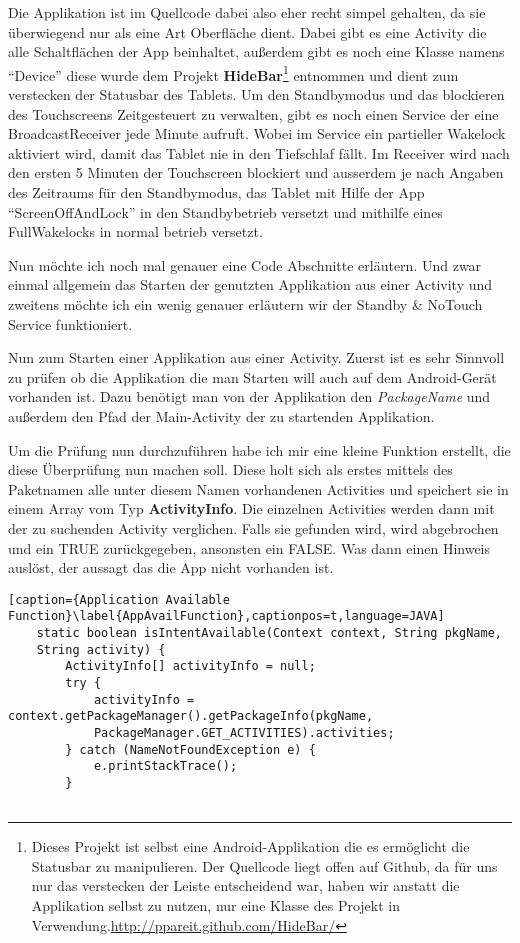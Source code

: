 \begin{flushleft}
Die Applikation ist im Quellcode dabei also eher recht simpel gehalten, da sie überwiegend nur als eine Art Oberfläche dient. Dabei gibt es eine Activity die alle Schaltflächen der App beinhaltet, außerdem gibt es noch eine Klasse namens ``Device'' diese wurde dem Projekt \textbf{HideBar}\footnote{Dieses Projekt ist selbst eine Android-Applikation die es ermöglicht die Statusbar zu manipulieren. Der Quellcode liegt offen auf Github, da für uns nur das verstecken der Leiste entscheidend war, haben wir anstatt die Applikation selbst zu nutzen, nur eine Klasse des Projekt in Verwendung.\url{http://ppareit.github.com/HideBar/}} entnommen und dient zum verstecken der Statusbar des Tablets. Um den Standbymodus und das blockieren des Touchscreens Zeitgesteuert zu verwalten, gibt es noch einen Service der eine BroadcastReceiver jede Minute aufruft. Wobei im Service ein partieller Wakelock aktiviert wird, damit das Tablet nie in den Tiefschlaf fällt. Im Receiver wird nach den ersten 5 Minuten der Touchscreen blockiert und ausserdem je nach Angaben des Zeitraums für den Standbymodus, das Tablet mit Hilfe der App ``ScreenOffAndLock'' in den Standbybetrieb versetzt und mithilfe eines FullWakelocks in normal betrieb versetzt.

Nun möchte ich noch mal genauer eine Code Abschnitte erläutern. Und zwar einmal allgemein das Starten der genutzten Applikation aus einer Activity und zweitens möchte ich ein wenig genauer erläutern wir der Standby \& NoTouch Service funktioniert.

Nun zum Starten einer Applikation aus einer Activity. Zuerst ist es sehr Sinnvoll zu prüfen ob die Applikation die man Starten will auch auf dem Android-Gerät vorhanden ist. Dazu benötigt man von der Applikation den \textit{PackageName} und außerdem den Pfad der Main-Activity der zu startenden Applikation.

Um die Prüfung nun durchzuführen habe ich mir eine kleine Funktion erstellt, die diese Überprüfung nun machen soll. Diese holt sich als erstes mittels des Paketnamen alle unter diesem Namen vorhandenen Activities und speichert sie in einem Array vom Typ \textbf{ActivityInfo}. Die einzelnen Activities werden dann mit der zu suchenden Activity verglichen. Falls sie gefunden wird, wird abgebrochen und ein TRUE zurückgegeben, ansonsten ein FALSE. Was dann einen Hinweis auslöst, der aussagt das die App nicht vorhanden ist.

\begin{lstlisting}[caption={Application Available Function}\label{AppAvailFunction},captionpos=t,language=JAVA] 
	static boolean isIntentAvailable(Context context, String pkgName, 
	String activity) {
		ActivityInfo[] activityInfo = null;
		try {
			activityInfo = context.getPackageManager().getPackageInfo(pkgName,
			PackageManager.GET_ACTIVITIES).activities;
		} catch (NameNotFoundException e) {
			e.printStackTrace();
		}
				

\end{lstlisting}
\end{flushleft}
